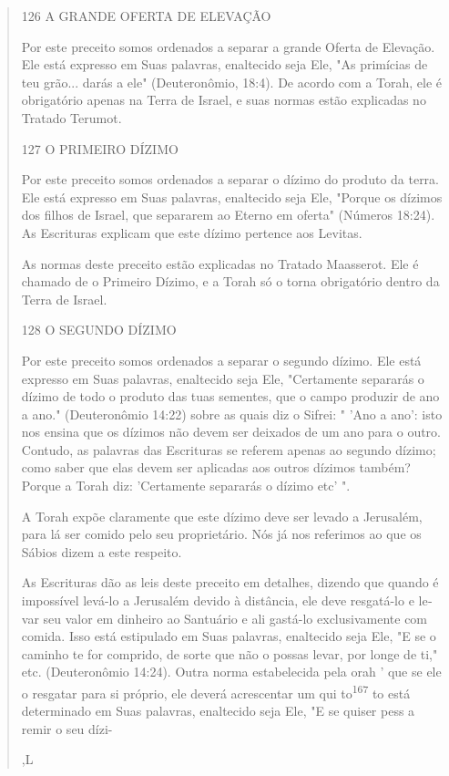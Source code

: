 \begin{quote}
126 A GRANDE OFERTA DE ELEVAÇÃO

Por este preceito somos ordenados a separar a grande Oferta de
Ele­vação. Ele está expresso em Suas palavras, enaltecido seja Ele, "As
primícias de teu grão... darás a ele" (Deuteronômio, 18:4). De acordo
com a Torah, ele é obrigatório apenas na Terra de Israel, e suas normas
estão explicadas no Tra­tado Terumot.

127 O PRIMEIRO DÍZIMO

Por este preceito somos ordenados a separar o dízimo do produto da
terra. Ele está expresso em Suas palavras, enaltecido seja Ele, "Porque
os dízimos dos filhos de Israel, que separarem ao Eterno em oferta"
(Números 18:24). As Escrituras explicam que este dízimo pertence aos
Levitas.

As normas deste preceito estão explicadas no Tratado Maasserot. Ele é
chamado de o Primeiro Dízimo, e a Torah só o torna obrigatório dentro da
Terra de Israel.

128 O SEGUNDO DÍZIMO

Por este preceito somos ordenados a separar o segundo dízimo. Ele está
expresso em Suas palavras, enaltecido seja Ele, "Certamente separarás o
dízimo de todo o produto das tuas sementes, que o campo produzir de ano
a ano." (Deuteronômio 14:22) sobre as quais diz o Sifrei: " 'Ano a ano':
isto nos ensina que os dízimos não devem ser deixados de um ano para o
outro. Contudo, as palavras das Escrituras se referem apenas ao segundo
dízimo; co­mo saber que elas devem ser aplicadas aos outros dízimos
também? Porque a Torah diz: 'Certamente separarás o dízimo etc' ".

A Torah expõe claramente que este dízimo deve ser levado a Jerusa­lém,
para lá ser comido pelo seu proprietário. Nós já nos referimos ao que os
Sábios dizem a este respeito.

As Escrituras dão as leis deste preceito em detalhes, dizendo que
quan­do é impossível levá-lo a Jerusalém devido à distância, ele deve
resgatá-lo e le­var seu valor em dinheiro ao Santuário e ali gastá-lo
exclusivamente com comi­da. Isso está estipulado em Suas palavras,
enaltecido seja Ele, "E se o caminho te for comprido, de sorte que não o
possas levar, por longe de ti," etc. (Deuteronômio 14:24). Outra norma
estabelecida pela orah ' que se ele o res­gatar para si próprio, ele
deverá acrescentar um qui to\textsuperscript{167} to está determi­nado
em Suas palavras, enaltecido seja Ele, "E se quiser pess a remir o seu
dízi-

{,L}
\end{quote}

